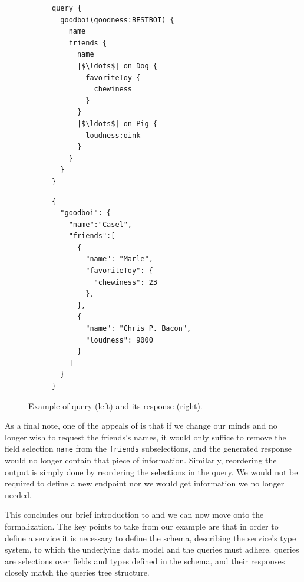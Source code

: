 \begin{figure}
\centering
\begin{subfigure}{.25\textwidth}
\begin{verbatim}
query {
  goodboi(goodness:BESTBOI) {
    name
    friends {
      name
      |$\ldots$| on Dog {
        favoriteToy {
          chewiness
        }
      }
      |$\ldots$| on Pig {
        loudness:oink
      }
    }
  }
}
\end{verbatim}
\label{fig:query_ex}
\end{subfigure}%
\begin{subfigure}{.25\textwidth}
\begin{verbatim}
{
  "goodboi": {
    "name":"Casel",
    "friends":[
      {
        "name": "Marle",
        "favoriteToy": {
          "chewiness": 23
        },
      },
      {
        "name": "Chris P. Bacon",
        "loudness": 9000
      }
    ]
  }
}
\end{verbatim}
\label{fig:response_ex}
\end{subfigure}

\caption{Example of \gql query (left) and its response (right).}
\label{fig:qres_ex}
\end{figure}


As a final note, one of the appeals of \gql is that if we change our minds and no longer wish to request the friends's names, it would only suffice to remove the field selection 
\texttt{name} from the \texttt{friends} subselections, and the generated response would no longer contain that piece of information. Similarly, reordering the output is simply done
by reordering the selections in the query.
We would not be required to define a new endpoint nor we would get information we no longer needed.



This concludes our brief introduction to \gql and we can now move onto the formalization.
The key points to take from our example are that in order to define a \gql service it is necessary to define the schema, describing the service's type system,
to which the underlying data model and the queries must adhere. \gql queries are selections over fields and types defined in the schema, and their responses closely match 
the queries tree structure.
